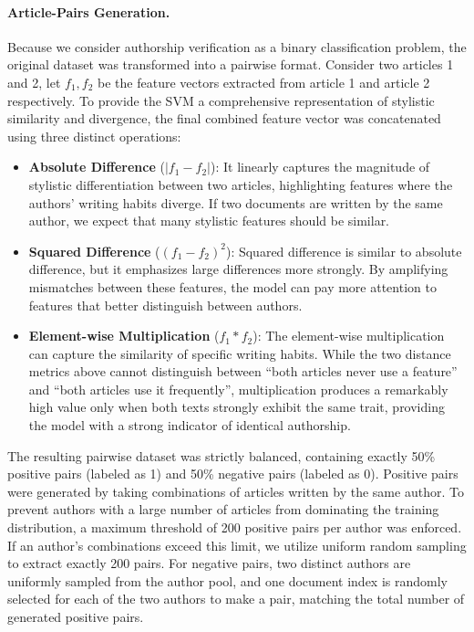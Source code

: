 \documentclass[11pt]{article}
\begin{document}
\paragraph{Article-Pairs Generation.}
Because we consider authorship verification as a binary classification problem, the original dataset was transformed into a pairwise format. Consider two articles 1 and 2, let $f_1, f_2$ be the feature vectors extracted from article 1 and article 2 respectively. To provide the SVM a comprehensive representation of stylistic similarity and divergence, the final combined feature vector was concatenated using three distinct operations:
\begin{itemize}\setlength\itemsep{1pt}
  \item \textbf{Absolute Difference} ($\lvert f_1 - f_2 \rvert$): It linearly captures the magnitude of stylistic differentiation between two articles, highlighting features where the authors' writing habits diverge. If two documents are written by the same author, we expect that many stylistic features should be similar.
  \item \textbf{Squared Difference} ($(f_1-f_2)^2$): Squared difference is similar to absolute difference, but it emphasizes large differences more strongly. By amplifying mismatches between these features, the model can pay more attention to features that better distinguish between authors.
  \item \textbf{Element-wise Multiplication} ($f_1 * f_2$): The element-wise multiplication can capture the similarity of specific writing habits. While the two distance metrics above cannot distinguish between ``both articles never use a feature'' and ``both articles use it frequently'', multiplication produces a remarkably high value only when both texts strongly exhibit the same trait, providing the model with a strong indicator of identical authorship.
\end{itemize}

The resulting pairwise dataset was strictly balanced, containing exactly 50\% positive pairs (labeled as 1) and 50\% negative pairs (labeled as 0). Positive pairs were generated by taking combinations of articles written by the same author. To prevent authors with a large number of articles from dominating the training distribution, a maximum threshold of 200 positive pairs per author was enforced. If an author's combinations exceed this limit, we utilize uniform random sampling to extract exactly 200 pairs. For negative pairs, two distinct authors are uniformly sampled from the author pool, and one document index is randomly selected for each of the two authors to make a pair, matching the total number of generated positive pairs.
\end{document}

